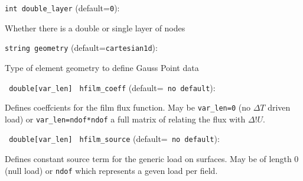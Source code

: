 \item\verb+int double_layer+ {\rm(default=\verb|0|)}:

Whether there is a double or single layer of nodes

\item\verb+string geometry+ {\rm(default=\verb|cartesian1d|)}:

Type of element geometry to define Gauss Point data

\item\verb+ double[var_len]+ \verb+ hfilm_coeff+ {\rm(default=\verb| no default|)}:
 
Defines coeffcients for the film flux function. May be 
\verb+var_len=0+ (no $\Delta T$ driven load) or
\verb+var_len=ndof*ndof+ a full matrix of relating the flux with
$\Delta !U$. 
\item\verb+ double[var_len]+ \verb+ hfilm_source+ {\rm(default=\verb| no default|)}:
 
Defines constant source term for the generic load on
surfaces. May be of length 0 (null load) or \verb+ndof+
which represents a geven load per field. 
